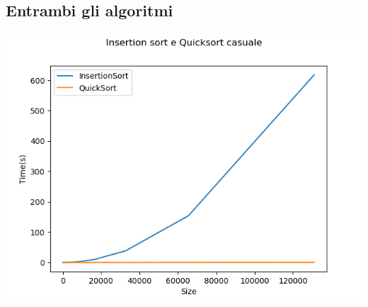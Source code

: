 \documentclass[]{article}
\begin{document}
\subsection{Entrambi gli algoritmi}
\begin{center}
\includegraphics[scale=0.5]{InsertionSortEQuicksortCasuale}\\
\end{center}
\end{document}
